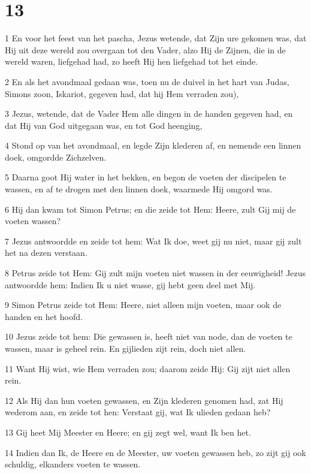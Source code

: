 \chapter{13}

\par 1 En voor het feest van het pascha, Jezus wetende, dat Zijn ure gekomen was, dat Hij uit deze wereld zou overgaan tot den Vader, alzo Hij de Zijnen, die in de wereld waren, liefgehad had, zo heeft Hij hen liefgehad tot het einde.
\par 2 En als het avondmaal gedaan was, toen nu de duivel in het hart van Judas, Simons zoon, Iskariot, gegeven had, dat hij Hem verraden zou),
\par 3 Jezus, wetende, dat de Vader Hem alle dingen in de handen gegeven had, en dat Hij van God uitgegaan was, en tot God heenging,
\par 4 Stond op van het avondmaal, en legde Zijn klederen af, en nemende een linnen doek, omgordde Zichzelven.
\par 5 Daarna goot Hij water in het bekken, en begon de voeten der discipelen te wassen, en af te drogen met den linnen doek, waarmede Hij omgord was.
\par 6 Hij dan kwam tot Simon Petrus; en die zeide tot Hem: Heere, zult Gij mij de voeten wassen?
\par 7 Jezus antwoordde en zeide tot hem: Wat Ik doe, weet gij nu niet, maar gij zult het na dezen verstaan.
\par 8 Petrus zeide tot Hem: Gij zult mijn voeten niet wassen in der eeuwigheid! Jezus antwoordde hem: Indien Ik u niet wasse, gij hebt geen deel met Mij.
\par 9 Simon Petrus zeide tot Hem: Heere, niet alleen mijn voeten, maar ook de handen en het hoofd.
\par 10 Jezus zeide tot hem: Die gewassen is, heeft niet van node, dan de voeten te wassen, maar is geheel rein. En gijlieden zijt rein, doch niet allen.
\par 11 Want Hij wist, wie Hem verraden zou; daarom zeide Hij: Gij zijt niet allen rein.
\par 12 Als Hij dan hun voeten gewassen, en Zijn klederen genomen had, zat Hij wederom aan, en zeide tot hen: Verstaat gij, wat Ik ulieden gedaan heb?
\par 13 Gij heet Mij Meester en Heere; en gij zegt wel, want Ik ben het.
\par 14 Indien dan Ik, de Heere en de Meester, uw voeten gewassen heb, zo zijt gij ook schuldig, elkanders voeten te wassen.
